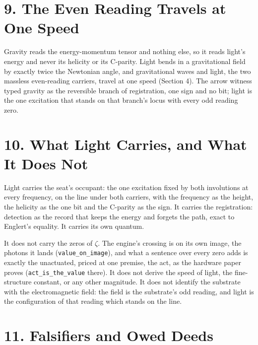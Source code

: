 \documentclass[10pt]{article}
\begin{document}
\hypertarget{the-even-reading-travels-at-one-speed}{%
\section{9. The Even Reading Travels at One
Speed}\label{the-even-reading-travels-at-one-speed}}

Gravity reads the energy-momentum tensor and nothing else, so it reads
light's energy and never its helicity or its C-parity. Light bends in a
gravitational field by exactly twice the Newtonian angle, and
gravitational waves and light, the two massless even-reading carriers,
travel at one speed (Section 4). The arrow witness typed gravity as the
reversible branch of registration, one sign and no bit; light is the one
excitation that stands on that branch's locus with every odd reading
zero.

\hypertarget{what-light-carries-and-what-it-does-not}{%
\section{10. What Light Carries, and What It Does
Not}\label{what-light-carries-and-what-it-does-not}}

Light carries the seat's occupant: the one excitation fixed by both
involutions at every frequency, on the line under both carriers, with
the frequency as the height, the helicity as the one bit and the
C-parity as the sign. It carries the registration: detection as the
record that keeps the energy and forgets the path, exact to Englert's
equality. It carries its own quantum.

It does not carry the zeros of \(\zeta\). The engine's crossing is on
its own image, the photons it lands (\texttt{value\_on\_image}), and
what a sentence over every zero adds is exactly the unactuated, priced
at one premise, the act, as the hardware paper proves
(\texttt{act\_is\_the\_value} there). It does not derive the speed of
light, the fine-structure constant, or any other magnitude. It does not
identify the substrate with the electromagnetic field: the field is the
substrate's odd reading, and light is the configuration of that reading
which stands on the line.

\hypertarget{falsifiers-and-owed-deeds}{%
\section{11. Falsifiers and Owed
Deeds}\label{falsifiers-and-owed-deeds}}
\end{document}
